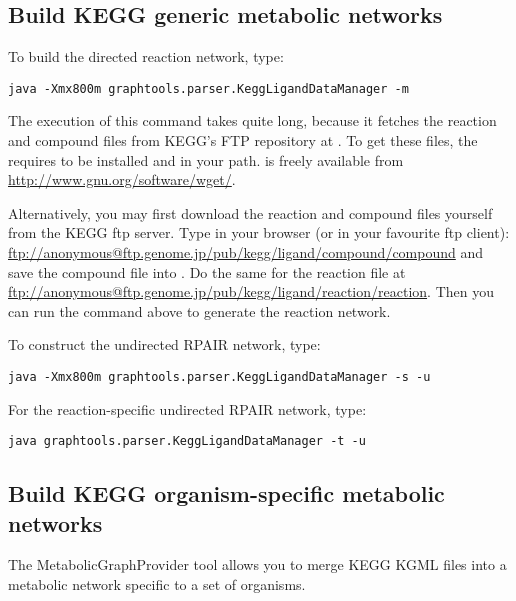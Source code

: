 \subsection{Build KEGG generic metabolic networks} 

To build the directed reaction network, type:

\begin{verbatim}
java -Xmx800m graphtools.parser.KeggLigandDataManager -m
\end{verbatim}

The execution of this command takes quite long, because it fetches the reaction
and compound files from KEGG's FTP repository at . 
To get these files, the  requires
 to be installed and in your path.  is 
freely available from \url{http://www.gnu.org/software/wget/}.

Alternatively, you may first download the reaction and compound files yourself
from the KEGG ftp server. Type in your browser (or in your favourite ftp
client): \url{ftp://anonymous@ftp.genome.jp/pub/kegg/ligand/compound/compound}
and save the compound file into \RSAT{}. Do the same
for the reaction file at
\url{ftp://anonymous@ftp.genome.jp/pub/kegg/ligand/reaction/reaction}. 
Then you can run the command above to generate the reaction network.

To construct the undirected RPAIR network, type:

\begin{verbatim}
java -Xmx800m graphtools.parser.KeggLigandDataManager -s -u
\end{verbatim}

For the reaction-specific undirected RPAIR network, type:

\begin{verbatim}
java graphtools.parser.KeggLigandDataManager -t -u
\end{verbatim}

\subsection{Build KEGG organism-specific metabolic networks}

The MetabolicGraphProvider tool allows you to merge KEGG KGML files into
a metabolic network specific to a set of organisms. 

 
